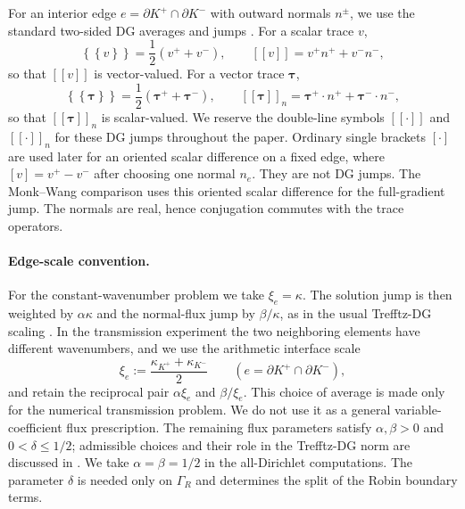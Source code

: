 \documentclass[pdflatex,sn-mathphys-num]{sn-jnl}
\theoremstyle{thmstyleone}
\theoremstyle{thmstyletwo}
\newcommand{\jump}[1]{\left[\!\left[#1\right]\!\right]}
\newcommand{\jumpn}[1]{\left[\!\left[#1\right]\!\right]_{n}}
\newcommand{\sjump}[1]{[#1]}
\newcommand{\avg}[1]{\left\{\!\left\{#1\right\}\!\right\}}
\begin{document}
For an interior edge $e=\partial K^+\cap\partial K^-$ with outward normals $n^\pm$, we use the standard two-sided DG averages and jumps \cite{KapitaMonkWarburton2015,HiptmairMoiolaPerugia2011,HiptmairMoiolaPerugiaSurvey2016}.  For a scalar trace $v$,
\begin{equation}\label{eq:scalar-jump}
 \avg{v}=\frac12(v^++v^-),
 \qquad
 \jump{v}=v^+n^+ + v^-n^- ,
\end{equation}
so that $\jump{v}$ is vector-valued.  For a vector trace $\boldsymbol\tau$,
\begin{equation}\label{eq:vector-jump}
 \avg{\boldsymbol\tau}=\frac12(\boldsymbol\tau^++\boldsymbol\tau^-),
 \qquad
 \jumpn{\boldsymbol\tau}=\boldsymbol\tau^+\!\cdot n^+ + \boldsymbol\tau^-\!\cdot n^- ,
\end{equation}
so that $\jumpn{\boldsymbol\tau}$ is scalar-valued.  We reserve the double-line symbols $\jump{\cdot}$ and $\jumpn{\cdot}$ for these DG jumps throughout the paper.  Ordinary single brackets $\sjump{\cdot}$ are used later for an oriented scalar difference on a fixed edge, where $\sjump{v}=v^+-v^-$ after choosing one normal $n_e$.  They are not DG jumps.  The Monk--Wang comparison uses this oriented scalar difference for the full-gradient jump.  The normals are real, hence conjugation commutes with the trace operators.

\paragraph{Edge-scale convention.}
For the constant-wavenumber problem we take $\xi_e=\kappa$.  The solution jump is then weighted by $\alpha\kappa$ and the normal-flux jump by $\beta/\kappa$, as in the usual Trefftz-DG scaling \cite{HiptmairMoiolaPerugia2011,HiptmairMoiolaPerugiaSurvey2016}.  In the transmission experiment the two neighboring elements have different wavenumbers, and we use the arithmetic interface scale
\begin{equation}\label{eq:xi-interface}
 \xi_e:=\frac{\kappa_{K^+}+\kappa_{K^-}}{2}
 \qquad (e=\partial K^+\cap\partial K^-),
\end{equation}
and retain the reciprocal pair $\alpha\xi_e$ and $\beta/\xi_e$.  This choice of average is made only for the numerical transmission problem.  We do not use it as a general variable-coefficient flux prescription.  The remaining flux parameters satisfy $\alpha,\beta>0$ and $0<\delta\le1/2$; admissible choices and their role in the Trefftz-DG norm are discussed in \cite{GittelsonHiptmairPerugia2009,HiptmairMoiolaPerugia2011}.  We take $\alpha=\beta=1/2$ in the all-Dirichlet computations.  The parameter $\delta$ is needed only on $\Gamma_R$ and determines the split of the Robin boundary terms.
\end{document}
